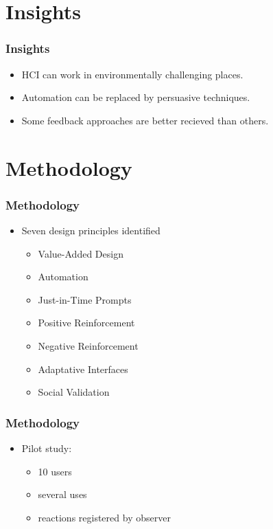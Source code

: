 \documentclass{beamer}
\begin{document}
\section{Insights}
\begin{frame}
	\frametitle{Insights}
	\begin{itemize}
	  \item HCI can work in environmentally challenging places.
          \item Automation can be replaced by persuasive techniques.
          \item Some feedback approaches are better recieved than others.
        \end{itemize}          

\end{frame}
\section{Methodology}
\begin{frame}
  \frametitle{Methodology}
  \begin{itemize}
  \item Seven design principles identified
    \begin{itemize}
    \item Value-Added Design
    \item Automation
    \item Just-in-Time Prompts
    \item Positive Reinforcement
    \item Negative Reinforcement
    \item Adaptative Interfaces
    \item Social Validation
    \end{itemize}
  \end{itemize}
\end{frame}


\begin{frame}
  \frametitle{Methodology}
  \begin{itemize}
  \item Pilot study: 
    \begin{itemize}
    \item 10 users
    \item several uses
    \item reactions registered by observer
    \end{itemize}
  \end{itemize}
\end{frame}
\end{document}
